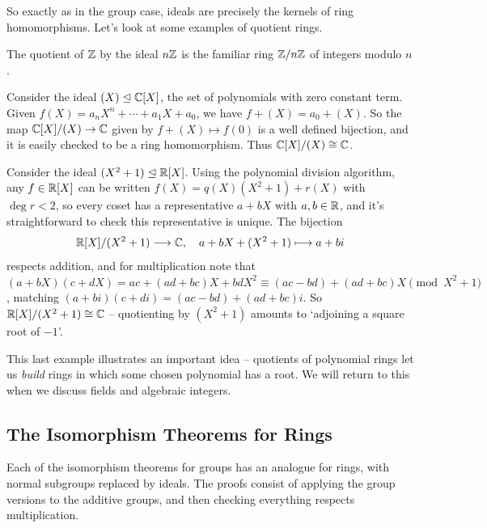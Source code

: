\documentclass[a4paper]{scrartcl}
\begin{document}
So exactly as in the group case, ideals are precisely the kernels of ring homomorphisms. Let's look at some examples of quotient rings.

\begin{example}[Quotients of $\Z$]
	The quotient of $\Z$ by the ideal $n\mathbb{Z}$ is the familiar ring $\mathbb{Z}/n\mathbb{Z}$ of integers modulo $n$.
\end{example}

\begin{example}[{$\C[X]/(X)$}]
	Consider the ideal $(X) \trianglelefteq \mathbb{C}[X]$, the set of polynomials with zero constant term. Given $f(X) = a_n X^n + \cdots + a_1 X + a_0$, we have $f + (X) = a_0 + (X)$. So the map $\mathbb{C}[X]/(X) \rightarrow \mathbb{C}$ given by $f + (X) \mapsto f(0)$ is a well defined bijection, and it is easily checked to be a ring homomorphism. Thus $\mathbb{C}[X]/(X) \cong \mathbb{C}$.
\end{example}

\begin{example}[{$\R[X]/(X^2 + 1)$}]
	Consider the ideal $(X^2 + 1) \trianglelefteq \mathbb{R}[X]$. Using the polynomial division algorithm, any $f \in \mathbb{R}[X]$ can be written $f(X) = q(X)(X^2 + 1) + r(X)$ with $\deg r < 2$, so every coset has a representative $a + bX$ with $a, b \in \mathbb{R}$, and it's straightforward to check this representative is unique. The bijection
	$$
	\mathbb{R}[X]/(X^2 + 1) \longrightarrow \mathbb{C}, \quad a + bX + (X^2 + 1) \longmapsto a + bi
	$$
	respects addition, and for multiplication note that $(a + bX)(c + dX) = ac + (ad + bc)X + bdX^2 \equiv (ac - bd) + (ad + bc)X \pmod{X^2 + 1}$, matching $(a + bi)(c + di) = (ac - bd) + (ad + bc)i$. So $\mathbb{R}[X]/(X^2 + 1) \cong \mathbb{C}$ -- quotienting by $(X^2+1)$ amounts to `adjoining a square root of $-1$'.
\end{example}

This last example illustrates an important idea -- quotients of polynomial rings let us \emph{build} rings in which some chosen polynomial has a root. We will return to this when we discuss fields and algebraic integers.

\subsection{The Isomorphism Theorems for Rings}

Each of the isomorphism theorems for groups has an analogue for rings, with normal subgroups replaced by ideals. The proofs consist of applying the group versions to the additive groups, and then checking everything respects multiplication.
\end{document}
